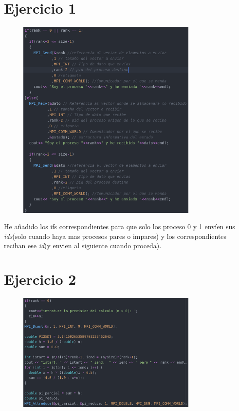 \section{Ejercicio 1}

\begin{figure}[H]
\centering
\includegraphics[width=0.8\textwidth]{imagenes/ej1.png}
\end{figure}

He añadido los ifs correspondientes para que solo los proceso 0 y 1 envíen sus \textit{ids}(solo cuando haya mas procesos pares o impares) y los correspondientes reciban ese \textit{id}(y envien al siguiente cuando proceda).

\section{Ejercicio 2}

\begin{figure}[H]
\centering
\includegraphics[width=0.8\textwidth]{imagenes/ej2.png}
\end{figure}

